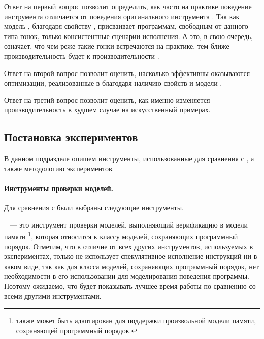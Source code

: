 Ответ на первый вопрос позволит определить, как часто 
на практике поведение инструмента \wmc отличается от поведения 
оригинального инструмента \genmc.
Так как модель \WkmS, благодаря свойству \LBRF, присваивает 
программам, свободным от данного типа гонок, 
только \RCMM консистентные сценарии исполнения. А 
это, в свою очередь, означает, что чем реже такие гонки встречаются на практике, 
тем ближе производительность \wmc будет к производительности \genmc.

Ответ на второй вопрос позволит оценить, насколько эффективны 
оказываются оптимизации, реализованные в \wmc благодаря 
наличию свойств \LBRF и \CL  модели \WkmS.  

Ответ на третий вопрос позволит оценить, как именно изменяется 
производительность \wmc в худшем случае на искусственный примерах.

\subsection*{Постановка экспериментов}

В данном подразделе опишем инструменты, использованные для сравнения 
с \wmc, а также методологию экспериментов.

\paragraph{Инструменты проверки моделей.}

Для сравнения с  \wmc были выбраны следующие инструменты. 

\textbf{\genmc}~\cite{Kokologiannakis:PLDI2019,Kokologiannakis:CAD2021} ---
это инструмент проверки моделей, выполняющий верификацию в модели памяти \RCMM%
\footnote{\genmc также может быть адаптирован для поддержки 
  произвольной модели памяти, сохраняющей программный порядок.}, 
которая относится к классу моделей, сохраняющих программный порядок.  
Отметим, что в отличие от всех других инструментов, используемых в экспериментах, 
только \genmc не использует спекулятивное исполнение инструкций 
ни в каком виде, так как для класса моделей, сохраняющих программный порядок,
нет необходимости в его использовании для моделирования поведения программы. 
Поэтому ожидаемо, что \genmc будет показывать 
лучшее время работы по сравнению со всеми другими инструментами. 

